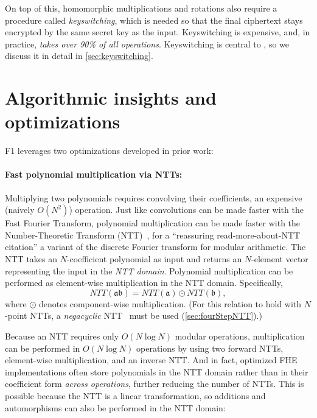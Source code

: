 On top of this, homomorphic multiplications and rotations also require a
procedure called \emph{keyswitching}, which is needed so that the final
ciphertext stays encrypted by the same secret key as the input. Keyswitching is
expensive, and, in practice, \emph{takes over 90\% of all operations}.
Keyswitching is central to \name, so we discuss it in detail in
\autoref{sec:keyswitching}.

\section{Algorithmic insights and optimizations}\label{sec:algoInsights}
\label{sec:fhe_optimizations}

F1 leverages two optimizations developed in prior work:

\paragraph{Fast polynomial multiplication via NTTs:} Multiplying two
polynomials requires convolving their coefficients, an expensive (naively
$O(N^2)$) operation. Just like convolutions can be made faster with the Fast
Fourier Transform, polynomial multiplication can be made faster with the
Number-Theoretic Transform (NTT)~\cite{moenck1976practical},  %
for a  ``reassuring read-more-about-NTT citation'' a variant of the discrete
Fourier transform for modular arithmetic. The NTT takes an $N$\hyp{}coefficient
polynomial as input and returns an $N$\hyp{}element vector representing the
input in the \textit{NTT domain}. Polynomial multiplication can be performed as
element-wise multiplication in the NTT domain. Specifically,
\begin{equation*}
    NTT(\mathfrak{a}\mathfrak{b}) = NTT(\mathfrak{a}) \odot NTT(\mathfrak{b}),
\end{equation*}
where $\odot$ denotes component-wise multiplication. (For this relation to hold
with $N$\hyp{}point NTTs, a \emph{negacyclic}
NTT~\cite{lyubashevsky:tact10:ideal} must be used (\autoref{sec:fourStepNTT}).)

Because an NTT requires only $O(N \log N)$ modular operations, multiplication
can be performed in $O(N \log N)$ operations by using two forward NTTs,
element-wise multiplication, and an inverse NTT. And in fact, optimized FHE
implementations often store polynomials in the NTT domain rather than in their
coefficient form \emph{across operations}, further reducing the number of NTTs.
This is possible because the NTT is a linear transformation, so additions and
automorphisms can also be performed in the NTT domain:

